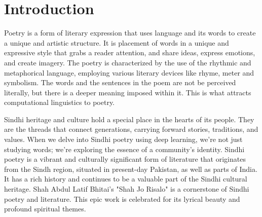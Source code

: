 \documentclass[conference]{IEEEtran}
\begin{document}
\section{Introduction}
Poetry is a form of literary expression that uses language and its words to create a unique and artistic structure. It is placement of words in a unique and expressive style that grabs a reader attention, and share ideas, express emotions, and create imagery. The poetry is characterized by the use of the rhythmic and metaphorical language, employing various literary devices like rhyme, meter and symbolism. The words and the sentences in the poem are not be perceived literally, but there is a deeper meaning imposed within it. This is what attracts computational linguistics to poetry. 
\par
Sindhi heritage and culture hold a special place in the hearts of its people. They are the threads that connect generations, carrying forward stories, traditions, and values. When we delve into Sindhi poetry using deep learning, we're not just studying words; we're exploring the essence of a community's identity. Sindhi poetry is a vibrant and culturally significant form of literature that originates from the Sindh region, situated in present-day Pakistan, as well as parts of India. It has a rich history and continues to be a valuable part of the Sindhi cultural heritage. Shah Abdul Latif Bhitai's "Shah Jo Risalo" is a cornerstone of Sindhi poetry and literature. This epic work is celebrated for its lyrical beauty and profound spiritual themes. 
\par
 
\end{document}
